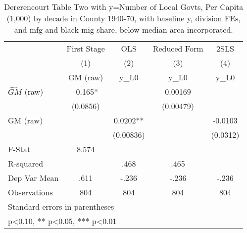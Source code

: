 \begin{table}[htbp]\centering
\def\sym#1{\ifmmode^{#1}\else\(^{#1}\)\fi}
\caption{Dererencourt Table Two with y=Number of Local Govts, Per Capita (1,000) by decade in County 1940-70, with baseline y, division FEs, and mfg and black mig share, below median area incorporated.}
\begin{tabular}{l*{4}{c}}
\toprule
                    & First Stage   &         OLS   &Reduced Form   &        2SLS   \\
                    &\multicolumn{1}{c}{(1)}&\multicolumn{1}{c}{(2)}&\multicolumn{1}{c}{(3)}&\multicolumn{1}{c}{(4)}\\
                    &\multicolumn{1}{c}{GM  (raw)}&\multicolumn{1}{c}{y\_L0}&\multicolumn{1}{c}{y\_L0}&\multicolumn{1}{c}{y\_L0}\\
\midrule
$\hat{GM}$ (raw)    &      -0.165*  &               &     0.00169   &               \\
                    &    (0.0856)   &               &   (0.00479)   &               \\
\addlinespace
GM  (raw)           &               &      0.0202** &               &     -0.0103   \\
                    &               &   (0.00836)   &               &    (0.0312)   \\
\midrule
F-Stat              &       8.574   &               &               &               \\
R-squared           &               &        .468   &        .465   &               \\
Dep Var Mean        &        .611   &       -.236   &       -.236   &       -.236   \\
Observations        &         804   &         804   &         804   &         804   \\
\bottomrule
\multicolumn{5}{l}{\footnotesize Standard errors in parentheses}\\
\multicolumn{5}{l}{\footnotesize * p<0.10, ** p<0.05, *** p<0.01}\\
\end{tabular}
\end{table}
